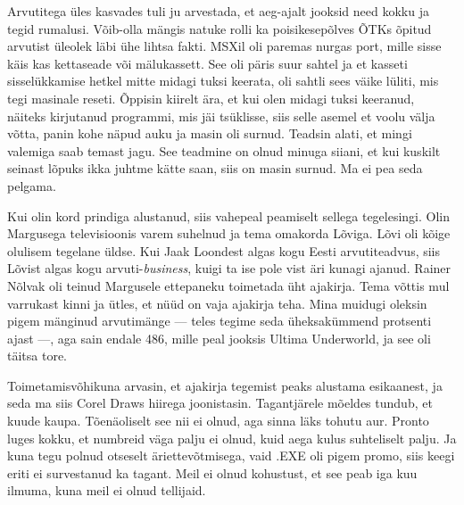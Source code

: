 Arvutitega üles kasvades tuli ju arvestada, et aeg-ajalt 
jooksid need kokku ja tegid rumalusi. Võib-olla mängis natuke 
rolli ka poisikesepõlves ÕTKs õpitud arvutist üleolek läbi ühe lihtsa fakti. 
MSXil oli paremas nurgas port, mille sisse käis kas 
kettaseade või mälukassett. See oli päris suur 
sahtel ja et kasseti sisselükkamise hetkel mitte midagi tuksi 
keerata, oli sahtli sees väike lüliti, mis tegi masinale reseti. 
Õppisin kiirelt ära, et kui olen midagi tuksi keeranud, näiteks 
kirjutanud programmi, mis jäi tsüklisse, siis selle asemel et voolu välja 
võtta, panin kohe näpud auku ja masin oli surnud. Teadsin alati, et 
mingi valemiga saab temast jagu. See teadmine on olnud minuga siiani, et kui 
kuskilt seinast lõpuks ikka juhtme kätte saan, siis on masin surnud. Ma ei pea 
seda pelgama.


Kui olin kord prindiga alustanud, siis vahepeal peamiselt sellega tegelesingi. 
Olin 
Margusega televisioonis varem suhelnud ja tema omakorda 
Lõviga. Lõvi oli kõige olulisem 
tegelane üldse. Kui Jaak Loondest algas kogu Eesti 
arvutiteadvus, siis 
Lõvist algas kogu arvuti-\emph{business}, kuigi ta ise pole vist 
äri kunagi ajanud. 
Rainer Nõlvak oli teinud Margusele ettepaneku 
toimetada üht ajakirja. Tema võttis mul varrukast kinni ja ütles, 
et nüüd on vaja ajakirja teha. Mina muidugi oleksin pigem 
mänginud arvutimänge --- teles tegime seda üheksakümmend 
protsenti ajast ---, aga sain endale 486, mille peal jooksis Ultima 
Underworld, ja 
see oli täitsa tore. 

Toimetamisvõhikuna arvasin, et ajakirja tegemist peaks alustama 
esikaanest, ja seda ma siis Corel Draws hiirega 
joonistasin. Tagantjärele mõeldes tundub, et 
kuude kaupa. Tõenäoliselt see nii ei olnud, aga sinna läks tohutu aur. 
Pronto luges kokku, et numbreid väga palju ei olnud, kuid 
aega kulus 
suhteliselt palju. Ja kuna tegu polnud otseselt 
äriettevõtmisega, vaid .EXE oli pigem promo, siis keegi eriti ei 
survestanud ka tagant. Meil ei olnud kohustust, et see peab iga kuu ilmuma, 
kuna meil ei olnud 
tellijaid.

